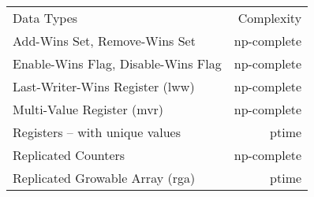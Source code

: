 \setlength{\tabcolsep}{1em}
\renewcommand{\arraystretch}{1.2}
\begin{tabular}{lr}
  \toprule
  Data Types & Complexity \\
  \cmidrule(lr){1-2}
  Add-Wins Set, Remove-Wins Set         & {\sc np}-complete \\
  Enable-Wins Flag, Disable-Wins Flag   & {\sc np}-complete \\
  Last-Writer-Wins Register ({\sc lww}) & {\sc np}-complete \\
  Multi-Value Register ({\sc mvr})      & {\sc np}-complete \\
  Registers – with unique values        & {\sc ptime} \\
  Replicated Counters                   & {\sc np}-complete \\
  Replicated Growable Array ({\sc rga}) & {\sc ptime} \\
  \bottomrule
\end{tabular}
